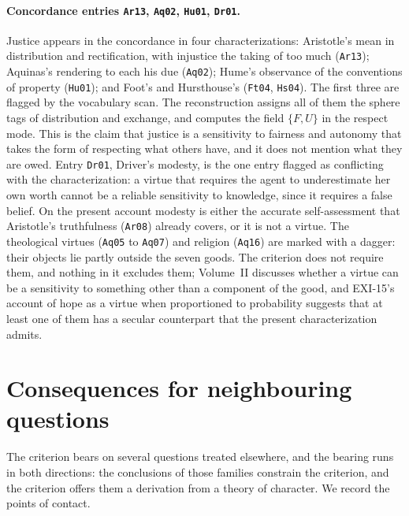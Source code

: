 \documentclass{situationist-preprint}
\begin{document}
\paragraph{Concordance entries \texttt{Ar13}, \texttt{Aq02}, \texttt{Hu01}, \texttt{Dr01}.} Justice appears in the concordance in four characterizations: Aristotle's mean in distribution and rectification, with injustice the taking of too much (\texttt{Ar13}); Aquinas's rendering to each his due (\texttt{Aq02}); Hume's observance of the conventions of property (\texttt{Hu01}); and Foot's and Hursthouse's (\texttt{Ft04}, \texttt{Hs04}). The first three are flagged by the vocabulary scan. The reconstruction assigns all of them the sphere tags of distribution and exchange, and computes the field $\{F,U\}$ in the respect mode. This is the claim that justice is a sensitivity to fairness and autonomy that takes the form of respecting what others have, and it does not mention what they are owed. Entry \texttt{Dr01}, Driver's modesty, is the one entry flagged as conflicting with the characterization: a virtue that requires the agent to underestimate her own worth cannot be a reliable sensitivity to knowledge, since it requires a false belief. On the present account modesty is either the accurate self-assessment that Aristotle's truthfulness (\texttt{Ar08}) already covers, or it is not a virtue. The theological virtues (\texttt{Aq05} to \texttt{Aq07}) and religion (\texttt{Aq16}) are marked with a dagger: their objects lie partly outside the seven goods. The criterion does not require them, and nothing in it excludes them; Volume~II discusses whether a virtue can be a sensitivity to something other than a component of the good, and EXI-15's account of hope as a virtue when proportioned to probability suggests that at least one of them has a secular counterpart that the present characterization admits.

\section{Consequences for neighbouring questions}\label{s:consequences}

The criterion bears on several questions treated elsewhere, and the bearing runs in both directions: the conclusions of those families constrain the criterion, and the criterion offers them a derivation from a theory of character. We record the points of contact.
\end{document}
